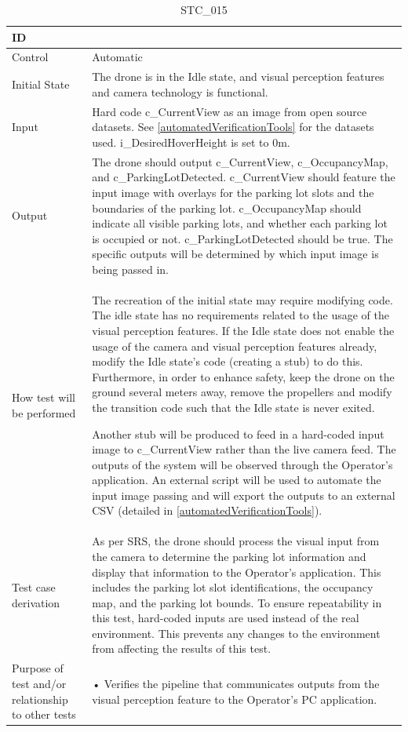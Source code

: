 \documentclass[12pt, titlepage]{article}
\begin{document}
\begin{table}[!h]
\begin{center}
\caption {STC\_015}
\label{tab:STC_015}
\begin{tabular}{ | m{3.2cm} | m{12.2cm} | } 
\hline
ID & \nameref{tab:STC_015} \\ 
\hline
Control & Automatic \\ 
\hline
Initial State & The drone is in the Idle state, and visual perception features and camera technology is functional.
\\ 
\hline
Input & Hard code c\_CurrentView as an image from open source datasets. See \ref{automatedVerificationTools} for the datasets used. i\_DesiredHoverHeight is set to 0m. \\ 
\hline
Output & The drone should output c\_CurrentView, c\_OccupancyMap, and c\_ParkingLotDetected. c\_CurrentView should feature the input image with overlays for the parking lot slots and the boundaries of the parking lot. c\_OccupancyMap should indicate all visible parking lots, and whether each parking lot is occupied or not. c\_ParkingLotDetected should be true. The specific outputs will be determined by which input image is being passed in. \\ 
\hline
How test will be performed & The recreation of the initial state may require modifying code. The idle state has no requirements related to the usage of the visual perception features. If the Idle state does not enable the usage of the camera and visual perception features already, modify the Idle state's code (creating a stub) to do this. Furthermore, in order to enhance safety, keep the drone on the ground several meters away, remove the propellers and modify the transition code such that the Idle state is never exited. 

Another stub will be produced to feed in a hard-coded input image to c\_CurrentView rather than the live camera feed. The outputs of the system will be observed through the Operator's application. An external script will be used to automate the input image passing and will export the outputs to an external CSV (detailed in \ref{automatedVerificationTools}). \\ 
\hline
Test case derivation & As per SRS, the drone should process the visual input from the camera to determine the parking lot information and display that information to the Operator's application. This includes the parking lot slot identifications, the occupancy map, and the parking lot bounds. To ensure repeatability in this test, hard-coded inputs are used instead of the real environment. This prevents any changes to the environment from affecting the results of this test.  \\ 
\hline
Purpose of test and/or relationship to other tests &  • Verifies the pipeline that communicates outputs from the visual perception feature to the Operator's PC application.


\end{tabular}
\end{center}
\end{table}
\end{document}
